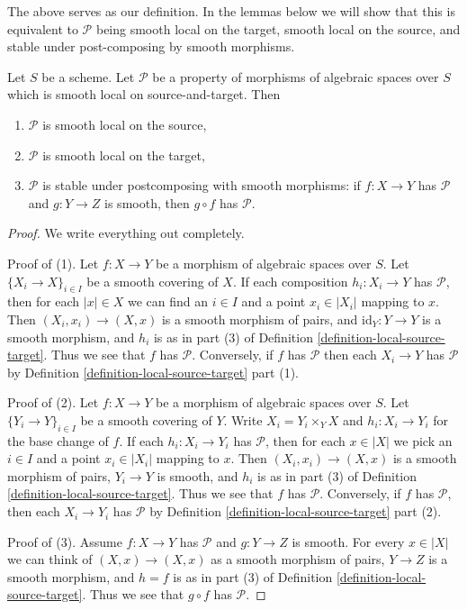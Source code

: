 \noindent
The above serves as our definition. In the lemmas below we will show that
this is equivalent to $\mathcal{P}$ being smooth local on the target,
smooth local on the source, and stable under post-composing by smooth morphisms.

\begin{lemma}
\label{lemma-local-source-target-implies}
Let $S$ be a scheme.
Let $\mathcal{P}$ be a property of morphisms of algebraic spaces over $S$
which is smooth local on source-and-target. Then
\begin{enumerate}
\item $\mathcal{P}$ is smooth local on the source,
\item $\mathcal{P}$ is smooth local on the target,
\item $\mathcal{P}$ is stable under postcomposing with smooth morphisms:
if $f : X \to Y$ has $\mathcal{P}$ and $g : Y \to Z$ is smooth, then
$g \circ f$ has $\mathcal{P}$.
\end{enumerate}
\end{lemma}

\begin{proof}
We write everything out completely.

\medskip\noindent
Proof of (1). Let $f : X \to Y$ be a morphism of algebraic spaces over $S$.
Let $\{X_i \to X\}_{i \in I}$ be a smooth covering of $X$. If each composition
$h_i : X_i \to Y$ has $\mathcal{P}$, then for each $|x| \in X$ we can find
an $i \in I$ and a point $x_i \in |X_i|$ mapping to $x$. Then
$(X_i, x_i) \to (X, x)$ is a smooth morphism of pairs, and
$\text{id}_Y : Y \to Y$ is a smooth morphism, and $h_i$ is as in part (3) of
Definition \ref{definition-local-source-target}.
Thus we see that $f$ has $\mathcal{P}$.
Conversely, if $f$ has $\mathcal{P}$ then each $X_i \to Y$ has
$\mathcal{P}$ by
Definition \ref{definition-local-source-target} part (1).

\medskip\noindent
Proof of (2). Let $f : X \to Y$ be a morphism of algebraic spaces over $S$.
Let $\{Y_i \to Y\}_{i \in I}$ be a smooth covering of $Y$.
Write $X_i = Y_i \times_Y X$ and $h_i : X_i \to Y_i$ for the base change
of $f$.  If each  $h_i : X_i \to Y_i$ has $\mathcal{P}$, then for each
$x \in |X|$ we pick an $i \in I$ and a point $x_i \in |X_i|$ mapping to $x$.
Then $(X_i, x_i) \to (X, x)$ is a smooth morphism of pairs, $Y_i \to Y$ is
smooth, and $h_i$ is as in part (3) of
Definition \ref{definition-local-source-target}.
Thus we see that $f$ has $\mathcal{P}$.
Conversely, if $f$ has $\mathcal{P}$, then each $X_i \to Y_i$ has
$\mathcal{P}$ by
Definition \ref{definition-local-source-target} part (2).

\medskip\noindent
Proof of (3). Assume $f : X \to Y$ has $\mathcal{P}$ and $g : Y \to Z$ is
smooth. For every $x \in |X|$ we can think of $(X, x) \to (X, x)$ as a
smooth morphism of pairs, $Y \to Z$ is a smooth morphism, and $h = f$ is as
in part (3) of
Definition \ref{definition-local-source-target}.
Thus we see that $g \circ f$ has $\mathcal{P}$.
\end{proof}

